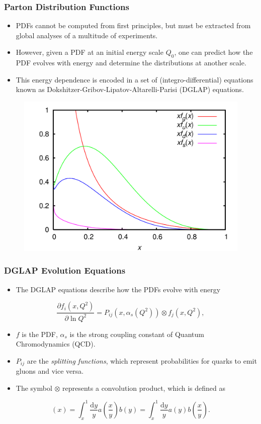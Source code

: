 \documentclass{beamer}
\newcommand{\dd}{\mathrm{d}}
\begin{document}
\begin{frame}
\frametitle{Parton Distribution Functions}

\begin{itemize}
\item PDFs cannot be computed from first principles, but must be extracted from global analyses of a multitude of experiments.
\item However, given a PDF at an initial energy scale $Q_0$, one can predict how the PDF evolves with energy and determine the distributions at another scale.
\item This energy dependence is encoded in a set of (integro-differential) equations known as Dokshitzer-Gribov-Lipatov-Altarelli-Parisi (DGLAP) equations.
\end{itemize}

\begin{figure}
  \centering
  \includegraphics[width=0.45\linewidth]{./gfx/pdfs.png}
\end{figure}

\end{frame}


\begin{frame}
  \frametitle{DGLAP Evolution Equations}

  \begin{itemize}
  \item The DGLAP equations describe how the PDFs evolve with energy
  \end{itemize}

  \begin{equation}
    \frac{\partial f_i(x,Q^2)}{\partial \ln Q^2} = P_{ij}(x, \alpha_s(Q^2)) \otimes f_j(x, Q^2),
  \end{equation}

  \begin{itemize}
  \item $f$ is the PDF, $\alpha_s$ is the strong coupling constant of Quantum Chromodynamics (QCD). 
  \item $P_{ij}$ are the \textit{splitting functions}, which represent probabilities for quarks to emit gluons and vice versa. 
  \item The symbol $\otimes$ represents a convolution product, which is defined as
  \end{itemize}

  \begin{equation}
    [a \otimes b](x) = \int_x^1 \frac{\dd y}{y} a\left( \frac{x}{y} \right) b(y) = \int_x^1 \frac{\dd y}{y} a(y) b\left( \frac{x}{y} \right).
  \end{equation}

\end{frame}
\end{document}

